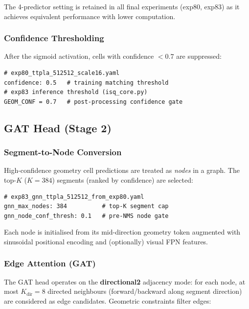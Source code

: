 \documentclass[11pt,a4paper]{article}
\begin{document}
The 4-predictor setting is retained in all final experiments (exp80, exp83)
as it achieves equivalent performance with lower computation.

\subsubsection{Confidence Thresholding}

After the sigmoid activation, cells with confidence $< 0.7$ are suppressed:

\begin{lstlisting}
# exp80_ttpla_512512_scale16.yaml
confidence: 0.5   # training matching threshold
# exp83 inference threshold (isq_core.py)
GEOM_CONF = 0.7   # post-processing confidence gate
\end{lstlisting}

\subsection{GAT Head (Stage 2)}
\label{subsec:gat_head}

\subsubsection{Segment-to-Node Conversion}

High-confidence geometry cell predictions are treated as \emph{nodes} in a graph.
The top-$K$ ($K = 384$) segments (ranked by confidence) are selected:

\begin{lstlisting}
# exp83_gnn_ttpla_512512_from_exp80.yaml
gnn_max_nodes: 384          # top-K segment cap
gnn_node_conf_thresh: 0.1   # pre-NMS node gate
\end{lstlisting}

Each node is initialised from its mid-direction geometry token
augmented with sinusoidal positional encoding and (optionally) visual FPN features.

\subsubsection{Edge Attention (GAT)}

The GAT head operates on the \textbf{directional2} adjacency mode:
for each node, at most $K_{\text{dir}} = 8$ directed neighbours
(forward/backward along segment direction) are considered as edge candidates.
Geometric constraints filter edges:
\end{document}
